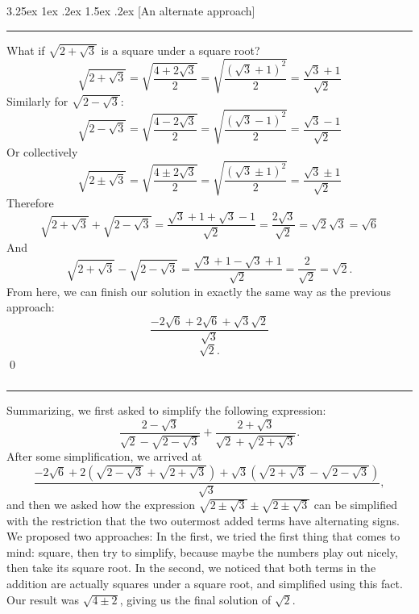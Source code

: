 \documentclass{article}
\makeatletter
\newcounter{subsubsubsection}[subsubsection]
\newcounter{subsubsubsubsection}[subsubsubsection]
\renewcommand\subsubsubsubsection{%
  \@startsection{subsubsubsubsection}{5}{\z@}%
  {3.25ex \@plus1ex \@minus.2ex}%
  {1.5ex \@plus .2ex}%
  {\normalfont\normalsize\bfseries}%
}
\makeatother
\begin{document}
\subsubsubsubsection[An alternate approach]{}
\vspace{-4pt}
\hrule
\vspace{10pt}
What if $\sqrt{2 + \sqrt{3}}$ is a square under a square root? 
\[
\sqrt{2 + \sqrt{3}} = \sqrt{\frac{4 + 2\sqrt{3}}{2}} = \sqrt{\frac{(\sqrt{3} + 1)^2}{2}} = \frac{\sqrt{3} + 1}{\sqrt{2}}
\]
Similarly for $\sqrt{2 - \sqrt{3}}$:
\[
\sqrt{2 - \sqrt{3}} = \sqrt{\frac{4 - 2\sqrt{3}}{2}} = \sqrt{\frac{(\sqrt{3} - 1)^2}{2}} = \frac{\sqrt{3} - 1}{\sqrt{2}}
\]
Or collectively
\[
\sqrt{2 \pm \sqrt{3}} = \sqrt{\frac{4 \pm 2\sqrt{3}}{2}} = \sqrt{\frac{(\sqrt{3} \pm 1)^2}{2}} = \frac{\sqrt{3} \pm 1}{\sqrt{2}}
\]
Therefore
\[
\sqrt{2 + \sqrt{3}} + \sqrt{2 - \sqrt{3}} = \frac{\sqrt{3} + 1 + \sqrt{3} - 1}{\sqrt{2}} = \frac{2\sqrt{3}}{\sqrt{2}} = \sqrt{2}\sqrt{3} = \sqrt{6}
\]
And
\[
\sqrt{2 + \sqrt{3}} - \sqrt{2 - \sqrt{3}} = \frac{\sqrt{3} + 1 - \sqrt{3} + 1}{\sqrt{2}} = \frac{2}{\sqrt{2}} = \sqrt{2}.
\]
From here, we can finish our solution in exactly the same way as the previous approach:
\[
\frac{-2\sqrt{6} + 2{\sqrt{6}} + \sqrt{3}\sqrt{2}}{\sqrt{3}}
\]
\[
\boxed{\sqrt{2}.}
\] \qed

\subsubsection[Summary]{}
\vspace{-8pt}
\hrule
\vspace{10pt}
Summarizing, we first asked to simplify the following expression:
\[
\frac{2 - \sqrt{3}}{\sqrt{2} - \sqrt{2 - \sqrt{3}}} + \frac{2 + \sqrt{3}}{\sqrt{2} + \sqrt{2 + \sqrt{3}}}.
\]
After some simplification, we arrived at
\[
\frac{-2\sqrt{6} + 2(\sqrt{2 - \sqrt{3}} + \sqrt{2 + \sqrt{3}}) + \sqrt{3}(\sqrt{2 + \sqrt{3}} - \sqrt{2 - \sqrt{3}})}{\sqrt{3}},
\]
and then we asked how the expression $\sqrt{2 \pm \sqrt{3}} \pm \sqrt{2 \pm \sqrt{3}}$ can be simplified with the restriction that the two outermost added terms have alternating signs.
We proposed two approaches: In the first, we tried the first thing that comes to mind: square, then try to simplify, because maybe the numbers play out nicely, then take its square root. In the second, we noticed that both terms in the addition are actually squares under a square root, and simplified using this fact. \\

Our result was $\sqrt{4 \pm 2}$, giving us the final solution of $\sqrt{2}.$
\end{document}
